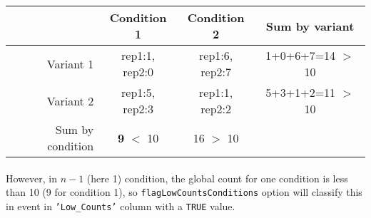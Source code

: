 \documentclass[a4paper,10pt]{article}
\begin{document}
\begin{tabular}{r|c|c|c}
  \hline
   & Condition 1 & Condition 2& Sum by variant \\
  \hline
  Variant 1 &	rep1:1, rep2:0 & rep1:6, rep2:7&  1+0+6+7=14 $>$ 10 \\
 Variant 2 &	rep1:5, rep2:3 & rep1:1, rep2:2&  5+3+1+2=11 $>$ 10 \\
  \hline
 Sum by condition &	\textbf{9} $<$ 10 	&16 $>$ 10 & \\ 	
  \hline
\end{tabular}

\paragraph{}However, in $n-1$ (here 1) condition, the global count for one condition is less than 10 (9 for condition 1), so \texttt{flagLowCountsConditions} option will classify this in event in \texttt{'Low\_Counts'} column with a \texttt{TRUE} value. 
\end{document}
